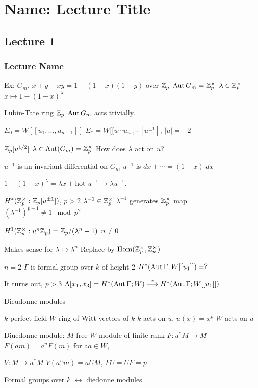 \newpage
\section{Name: Lecture Title}
\subsection{Lecture 1}
\subsubsection{Lecture Name}

Ex: $G_m$,
$x+y-xy= 1 - (1-x)(1-y)$
over $\mathbb{Z}_p$
$\operatorname{Aut} G_m= \mathbb{Z}_p^\times$
$\lambda \in \mathbb{Z}_p^\times$
$x \mapsto 1 - (1-x)^\lambda$

Lubin-Tate ring $\mathbb{Z}_p$
$\operatorname{Aut} G_m$ acts trivially.

$E_0= W[[u_1,\ldots,u_{n-1}]]$
$E_*= W[[u\cdots u_{n+1}[u^{\pm 1}]$, $|u|= -2$

$\mathbb{Z}_p[u^{1/2}]$
$\lambda \in \operatorname{Aut}(G_m)= \mathbb{Z}_p^\times$
How does $\lambda$ act on $u$?

$u^{-1}$ is an invariant differential on $G_m$
$u^{-1}$ is $dx+ \cdots= (1-x)\;dx$

$1-(1-x)^\lambda= \lambda x + \text{hot}$
$u^{-1} \mapsto \lambda u^{-1}$. 

$H^*(\mathbb{Z}_p^\times: \mathbb{Z}_p[u^{\pm 1}])$, $p>2$
$\lambda^{-1} \in \mathbb{Z}_p^\times$
$\lambda^{-1}$ generates $\mathbb{Z}_p^\times$ map 
$(\lambda^{-1})^{p-1} \neq 1 \mod p^2$

$H^1(\mathbb{Z}_p^\times : u^n \mathbb{Z}_p)= \mathbb{Z}_p/(\lambda^n-1)$
$n \neq 0$

Makes sense for $\lambda \mapsto \lambda^n$
Replace by $\operatorname{Hom}(\mathbb{Z}_p^\times,\mathbb{Z}_p^\times)$


$n=2$ 
$\Gamma$ is formal group over $k$ of height 2
$H^*(\operatorname{Aut} \Gamma; W[[u_1]])=?$

It turns out, $p>3$
$\Lambda[x_1,x_3]=H^*(\operatorname{Aut} \Gamma; W) \stackrel{x}{\longrightarrow} H^*(\operatorname{Aut} \Gamma; W[[u_1]])$


Dieudonne modules

$k$ perfect field
$W$ ring of Witt vectors of $k$
$k$ acts on $u$, $u(x)= x^p$
$W$ acts on $u$

Diuedonne-module:
$M$ free $W$-module of finite rank
$F: u^*M \to M$
$F(am)= a^u F(m)$ for a$a \in W$,

$V: M \to u^*M$
$V(a^um)= aUM$,
$FU=UF=p$

Formal groups over $k$ $\leftrightarrow$ diedonne modules


